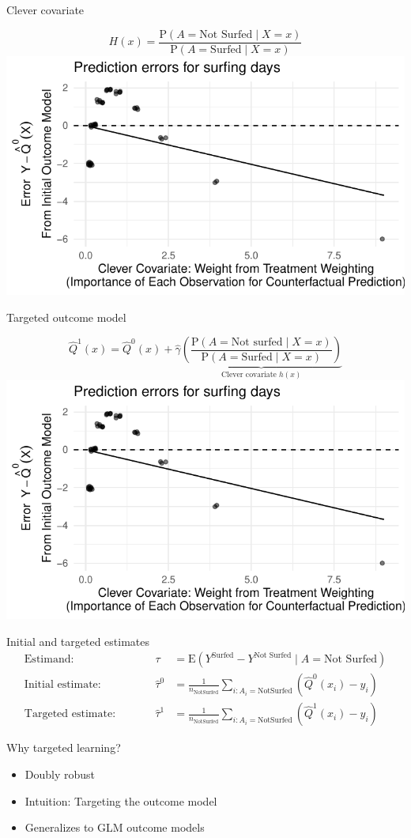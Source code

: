 \documentclass{beamer}
\newcommand\E{\text{E}}
\begin{document}
\begin{frame}{Clever covariate}

$$
H(x) = \frac{\text{P}(A = \text{Not Surfed} \mid X = x)}{\text{P}(A = \text{Surfed}\mid X = x)}
$$
\centering
\includegraphics[width = .7\textwidth]{figures/q1}

\end{frame}

\begin{frame}{Targeted outcome model}

$$
\hat{Q}^1(x) = \hat{Q}^0(x) + \hat\gamma \underbrace{\left(\frac{\text{P}(A = \text{Not surfed}\mid X = x)}{\text{P}(A = \text{Surfed}\mid X = x)}\right)}_{\text{Clever covariate }h(x)}
$$
\centering
\includegraphics[width = .7\textwidth]{figures/q1}

\end{frame}

\begin{frame}{Initial and targeted estimates}
$$
\begin{aligned}
\text{Estimand:} \qquad && \tau &= \E(Y^\text{Surfed}-Y^\text{Not Surfed}\mid A = \text{Not Surfed}) \\
\text{Initial estimate:}\qquad &&\hat\tau^0 &= \frac{1}{n_{\text{NotSurfed}}}\sum_{i:A_i=\text{NotSurfed}}\left(\hat{Q}^0(x_i) - y_i\right)\\
\text{Targeted estimate:}\qquad &&\hat\tau^1 &= \frac{1}{n_{\text{NotSurfed}}}\sum_{i:A_i=\text{NotSurfed}}\left(\hat{Q}^1(x_i) - y_i\right)
\end{aligned}
$$

\end{frame}

\begin{frame}

Why targeted learning? \pause
\begin{itemize}
\item Doubly robust
\item Intuition: Targeting the outcome model
\item Generalizes to GLM outcome models
\end{itemize}

\end{frame}
\end{document}
